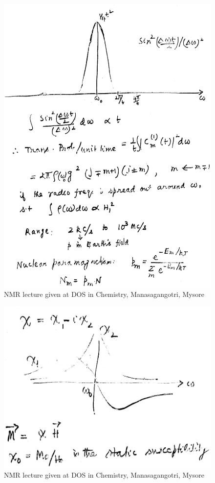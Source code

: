 \begin{figure}[H]
\centering
\includegraphics[scale=0.48]{src/images/chap8/6.eps}
\caption{NMR lecture given at DOS in Chemistry, Manasagangotri, Mysore}
\end{figure}
\begin{figure}[H]
\centering
\includegraphics[scale=0.48]{src/images/chap8/7.eps}
\caption{NMR lecture given at DOS in Chemistry, Manasagangotri, Mysore}
\end{figure}
